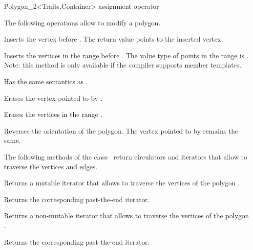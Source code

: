 \begin{ccClassTemplate}{Polygon_2<Traits,Container>}
  \ccHidden{}
   {assignment operator}

\newpage
{}

The following operations allow to modify a polygon.

    { Inserts the vertex  before .
      The return value points to the inserted vertex. }

    { Inserts the vertices in the range \ccStyle{[first, last)} before
      .
      \ccPrecond The value type of points in the range \ccStyle{[first,last)} is
                 .
      Note: this method is only available if the compiler supports member templates.
    }

    { Has the same semantics as .}

    { Erases the vertex pointed to by .}

    { Erases the vertices in the range \ccStyle{[first, last)}.}

    { Reverses the orientation of the polygon. The vertex pointed to by
       remains the same. }

The following methods of the class \ccClassName\ return
circulators and iterators that allow to traverse the vertices and edges.

    { Returns a mutable iterator that allows to traverse the vertices of
      the polygon .}

    { Returns the corresponding past-the-end iterator. }

    { Returns a non-mutable iterator that allows to traverse the vertices of
      the polygon .}

    { Returns the corresponding past-the-end iterator. }


\end{ccClassTemplate}
